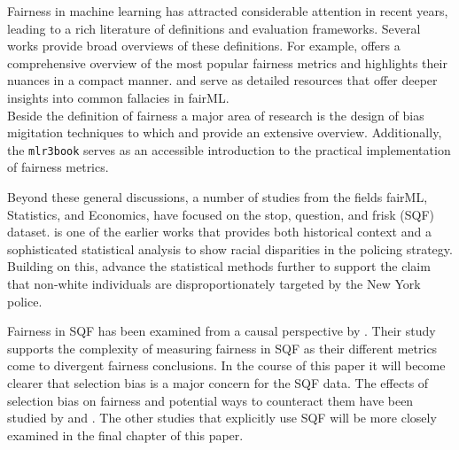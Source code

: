 Fairness in machine learning has attracted considerable attention in recent years, leading to a rich literature of definitions and evaluation frameworks. Several works provide broad overviews of these definitions. For example, \cite{verma2018} offers a comprehensive overview of the most popular fairness metrics and \cite{castelnovo2022} highlights their nuances in a compact manner. \cite{corbett-davies} and \cite{barocas} serve as detailed resources that offer deeper insights into common fallacies in fairML. \\

Beside the definition of fairness a major area of research is the design of bias migitation techniques to which \cite{mehrabi2022} and \cite{caton2024} provide an extensive overview. Additionally, the \texttt{mlr3book} serves as an accessible introduction to the practical implementation of fairness metrics.

Beyond these general discussions, a number of studies from the fields fairML, Statistics, and Economics, have focused on the stop, question, and frisk (SQF) dataset. \cite{gelman2007} is one of the earlier works that provides both historical context and a sophisticated statistical analysis to show racial disparities in the policing strategy. Building on this, \cite{goel2016} advance the statistical methods further to support the claim that non-white individuals are disproportionately targeted by the New York police.

Fairness in SQF has been examined from a causal perspective by \cite{Khademi2019FADMELC}. Their study supports the complexity of measuring fairness in SQF as their different metrics come to divergent fairness conclusions. In the course of this paper it will become clearer that selection bias is a major concern for the SQF data. The effects of selection bias on fairness and potential ways to counteract them have been studied by \cite{Lakkaraju2017SLPEAPPU} and \cite{favier2023}.
The other studies that explicitly use SQF \cite{Badr2022DTFANSP, RambachanBBOEFW, kallus2018} will be more closely examined in the final chapter of this paper.


